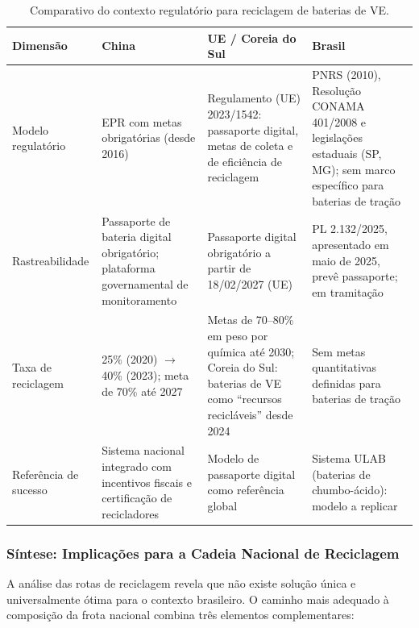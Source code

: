 \begin{table}[H]
\centering
\caption{Comparativo do contexto regulatório para reciclagem de baterias de VE.}
\label{tab:regulatorio}
\small
\renewcommand{\arraystretch}{1.2}
\begin{tabularx}{\textwidth}{@{} p{2.6cm} X X X @{}}
\toprule
\textbf{Dimensão} & \textbf{China} & \textbf{UE / Coreia do Sul} & \textbf{Brasil} \\
\midrule
Modelo regulatório &
EPR com metas obrigatórias (desde 2016) &
Regulamento (UE) 2023/1542: passaporte digital, metas de coleta e de eficiência
de reciclagem &
PNRS (2010), Resolução CONAMA 401/2008 e legislações estaduais (SP, MG); sem
marco específico para baterias de tração \\
\addlinespace
Rastreabilidade &
Passaporte de bateria digital obrigatório; plataforma governamental de
monitoramento &
Passaporte digital obrigatório a partir de 18/02/2027 (UE) &
PL 2.132/2025, apresentado em maio de 2025, prevê passaporte; em tramitação \\
\addlinespace
Taxa de reciclagem &
25\% (2020) $\to$ 40\% (2023); meta de 70\% até 2027 &
Metas de 70--80\% em peso por química até 2030; Coreia do Sul: baterias de VE
como ``recursos recicláveis'' desde 2024 &
Sem metas quantitativas definidas para baterias de tração \\
\addlinespace
Referência de sucesso &
Sistema nacional integrado com incentivos fiscais e certificação de recicladores &
Modelo de passaporte digital como referência global &
Sistema ULAB (baterias de chumbo-ácido): modelo a replicar \\
\bottomrule
\end{tabularx}
\end{table}

\subsubsection{Síntese: Implicações para a Cadeia Nacional de Reciclagem}
\label{subsec:sintese-reciclagem}

A análise das rotas de reciclagem revela que não existe solução única e
universalmente ótima para o contexto brasileiro. O caminho mais adequado à
composição da frota nacional combina três elementos complementares:

